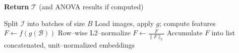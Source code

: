 \documentclass[10pt]{article}
\begin{document}
\begin{algorithm}[H]
\begin{small}
\begin{algorithmic}[1]
\State \textbf{Return} $\mathcal{T}$ (and ANOVA results if computed)

  \State Split $\mathcal{I}$ into batches of size $B$
    \State Load images, apply $g$; compute features $F \gets f(g(\mathcal{B}))$
    \State Row--wise L2--normalize $F \leftarrow \frac{F}{\|F\|_2}$
    \State Accumulate $F$ into list
  \EndFor
  \State \Return concatenated, unit--normalized embeddings
\EndFunction

\end{algorithmic}
\end{small}
\end{algorithm}
\end{document}
